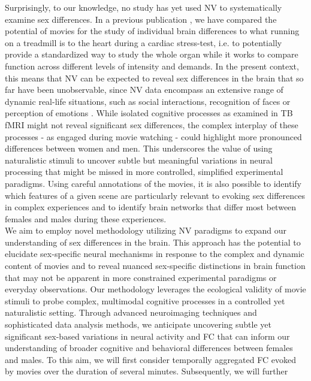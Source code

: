\documentclass[11pt,a4paper]{article}
\begin{document}
Surprisingly, to our knowledge, no study has yet used NV to systematically examine sex differences. 
In a previous publication \parencite{eickhoffClinicalApplicationsMovie2020a}, we have compared the potential of movies for the study of 
individual brain differences to what running on a treadmill is to the heart during a cardiac stress-test, 
i.e. to potentially provide a standardized way to study the whole organ while it works to compare function 
across different levels of intensity and demands. In the present context, this means that NV can be expected 
to reveal sex differences in the brain that so far have been unobservable, since NV data encompass an extensive 
range of dynamic real-life situations, such as social interactions, recognition of faces or perception of 
emotions \parencite{sonkusareNaturalisticStimuliNeuroscience2019}. While isolated cognitive processes as examined in TB fMRI might not reveal 
significant sex differences, the complex interplay of these processes - as engaged during movie watching - could 
highlight more pronounced differences between women and men. This underscores the value of using naturalistic stimuli 
to uncover subtle but meaningful variations in neural processing that might be missed in more controlled, simplified 
experimental paradigms. Using careful annotations of the movies, it is also possible to identify which features 
of a given scene are particularly relevant to evoking sex differences in complex experiences and to identify 
brain networks that differ most between females and males during these experiences.\\
We aim to employ novel methodology utilizing NV paradigms to expand our understanding of sex differences in the 
brain. This approach has the potential to elucidate sex-specific neural mechanisms in response to the complex and 
dynamic content of movies and to reveal nuanced sex-specific distinctions in brain function that may not be apparent 
in more constrained experimental paradigms or everyday observations. Our methodology leverages the ecological 
validity of movie stimuli to probe complex, multimodal cognitive processes in a controlled yet naturalistic setting. 
Through advanced neuroimaging techniques and sophisticated data analysis methods, we anticipate uncovering 
subtle yet significant sex-based variations in neural activity and FC that can inform our understanding of 
broader cognitive and behavioral differences between females and males. To this aim, we will first consider 
temporally aggregated FC evoked by movies over the duration of several minutes. Subsequently, we will further 
\end{document}
